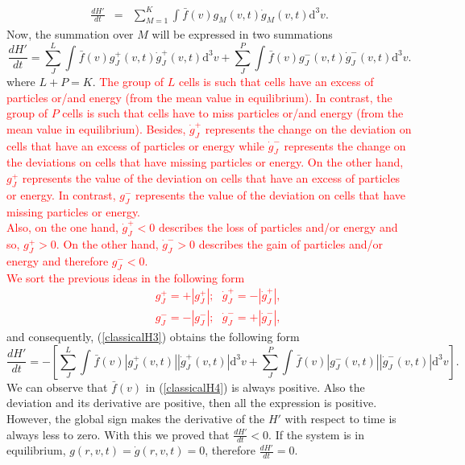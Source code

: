 \documentclass{article}
\begin{document}
\begin{eqnarray}
\frac{dH'}{dt}&=&\sum_{M=1}^{K}\int_{}^{}\bar f(v)g_M(v,t)\dot g_M(v,t)\mathrm{d}^3v.
\end{eqnarray}
Now, the summation over $M$ will be expressed in two summations
\begin{equation}
    \frac{dH'}{dt}=\sum_J^{L}\int_{}^{}\bar f(v)g_J^{+}(v,t)\dot g_J^{+}(v,t)\mathrm{d}^3v +\sum_J^{P}\int_{}^{}\bar f(v)g_J^{-}(v,t)\dot g_J^{-}(v,t)\mathrm{d}^3v. \label{classicalH3}
\end{equation}
where $L+P=K$. \textcolor{red}{The group of $L$ cells is such that cells have an excess of particles or/and energy (from the mean value in equilibrium). In contrast, the group of $P$ cells is such that cells have to miss particles or/and energy (from the mean value in equilibrium). Besides, $\dot{g}^{+}_{J}$ represents the change on the deviation on cells that have an excess of particles or energy while $\dot{g}^{-}_{J}$  represents the change on the deviations on cells that have missing particles or energy. 
On the other hand, $g^{+}_{J}$  represents the value of the deviation on cells that have an excess of particles or energy. In contrast, $g^{-}_{J}$ represents the value of the deviation on cells that have missing particles or energy.\\
Also, on the one hand, $\dot{g}^{+}_{J}<0$ describes the loss of particles and/or energy and so, $g^{+}_{J}>0$. On the other hand, $\dot{g}^{-}_{J}>0$ describes the gain of particles and/or energy and therefore $g^{-}_{J}<0$. \\
We sort the previous ideas in the following form
\begin{eqnarray}
   &&g^{+}_{J}=+|g^{+}_{J}|; \ \ \  \dot{g}^{+}_{J}=-|\dot{g}^{+}_{J}|, \nonumber \\
   &&g^{-}_{J}=-|g^{-}_{J}|; \ \ \ \dot{g}^{-}_{J}=+|\dot{g}^{-}_{J}| \label{separacionclassical},
\end{eqnarray}}
and consequently, (\ref{classicalH3}) obtains the following form
\begin{equation}
    \frac{dH'}{dt}=-\left[
                               \sum_J^{L}\int_{}^{}\bar f(v)|g_J^{+}(v,t)||\dot g_J^{+}(v,t)|\mathrm{d}^3v +\sum_J^{P}\int_{}^{}\bar f(v)|g_J^{-}(v,t)||\dot g_J^{-}(v,t)|\mathrm{d}^3v 
    \right]. \label{classicalH4}
\end{equation}
We can observe that $\bar{f}(v)$ in (\ref{classicalH4}) is always positive. Also the deviation and its derivative are positive, then all the expression is positive. However, the global sign makes the derivative of the $H'$ with respect to time is always less to zero. With this we proved that $\frac{dH'}{dt}<0$. If the system is in equilibrium, $g(r,v,t)=\dot g(r,v,t)=0$, therefore $\frac{dH'}{dt}=0$.\\
\end{document}
